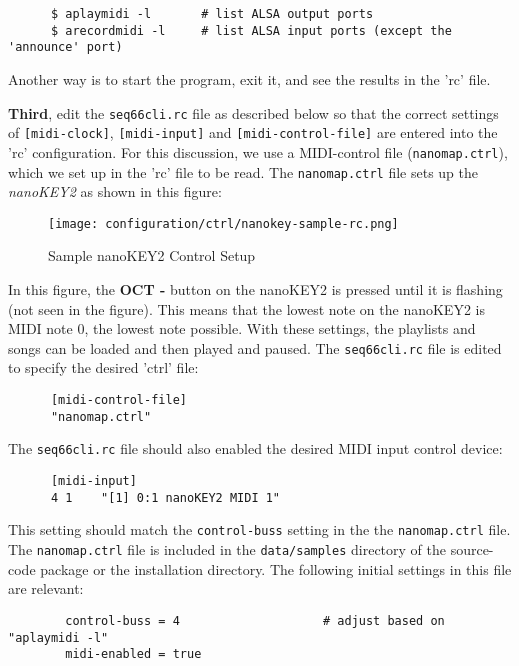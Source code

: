    \begin{verbatim}
      $ aplaymidi -l       # list ALSA output ports
      $ arecordmidi -l     # list ALSA input ports (except the 'announce' port)
   \end{verbatim}

   Another way is to start the program, exit it, and see the results in the
   'rc' file.

   \textbf{Third}, edit the \texttt{seq66cli.rc}
   file as described below so that the correct settings of
   \texttt{[midi-clock]}, \texttt{[midi-input]} and
   \texttt{[midi-control-file]} are entered into the 'rc' configuration.
   For this discussion, we use a MIDI-control file 
   (\texttt{nanomap.ctrl}), which we set up
   in the 'rc' file to be read.
   The \texttt{nanomap.ctrl} file sets up the \textsl{nanoKEY2} as
   shown in this figure:

\begin{figure}[H]
   \centering 
   \texttt{[image: configuration/ctrl/nanokey-sample-rc.png]}
   \caption{Sample nanoKEY2 Control Setup}
   \label{fig:headless_nanokey2_setup}
\end{figure}

   In this figure, the \textbf{OCT -} button on the nanoKEY2 is pressed until
   it is flashing (not seen in the figure).
   This means that the lowest note on the nanoKEY2 is MIDI note 0, the lowest
   note possible.  With these settings, the playlists and songs can be loaded
   and then played and paused.
   The \texttt{seq66cli.rc} file is edited to specify the desired 'ctrl' file:

   \begin{verbatim}
      [midi-control-file]
      "nanomap.ctrl"
   \end{verbatim}

   The \texttt{seq66cli.rc} file should also enabled the desired MIDI input
   control device:

   \begin{verbatim}
      [midi-input]
      4 1    "[1] 0:1 nanoKEY2 MIDI 1"
   \end{verbatim}

   This setting should match the \texttt{control-buss} setting in the
   the \texttt{nanomap.ctrl} file.  The \texttt{nanomap.ctrl} file is included
   in the \texttt{data/samples} directory of the source-code package or the
   installation directory.  The following initial settings in this file are
   relevant:

   \begin{verbatim}
		control-buss = 4					# adjust based on "aplaymidi -l"
		midi-enabled = true
   \end{verbatim}

